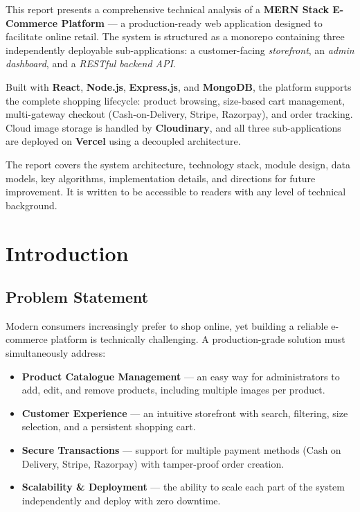 \documentclass[12pt,a4paper]{report}
\begin{document}
This report presents a comprehensive technical analysis of a \textbf{MERN Stack E-Commerce Platform}
— a production-ready web application designed to facilitate online retail.
The system is structured as a monorepo containing three independently deployable sub-applications:
a customer-facing \textit{storefront}, an \textit{admin dashboard}, and a \textit{RESTful backend API}.

Built with \textbf{React}, \textbf{Node.js}, \textbf{Express.js}, and \textbf{MongoDB}, the platform supports
the complete shopping lifecycle: product browsing, size-based cart management, multi-gateway checkout
(Cash-on-Delivery, Stripe, Razorpay), and order tracking.
Cloud image storage is handled by \textbf{Cloudinary}, and all three sub-applications are deployed on
\textbf{Vercel} using a decoupled architecture.

The report covers the system architecture, technology stack, module design, data models, key algorithms,
implementation details, and directions for future improvement.
It is written to be accessible to readers with any level of technical background.

\tableofcontents
\listoffigures
\listoftables

\chapter{Introduction}

\section{Problem Statement}

Modern consumers increasingly prefer to shop online, yet building a reliable e-commerce platform is
technically challenging.
A production-grade solution must simultaneously address:

\begin{itemize}[leftmargin=*, label=\textbullet]
  \item \textbf{Product Catalogue Management} — an easy way for administrators to add, edit, and remove
        products, including multiple images per product.
  \item \textbf{Customer Experience} — an intuitive storefront with search, filtering, size selection,
        and a persistent shopping cart.
  \item \textbf{Secure Transactions} — support for multiple payment methods
        (Cash on Delivery, Stripe, Razorpay) with tamper-proof order creation.
  \item \textbf{Scalability \& Deployment} — the ability to scale each part of the system independently
        and deploy with zero downtime.
\end{itemize}
\end{document}
